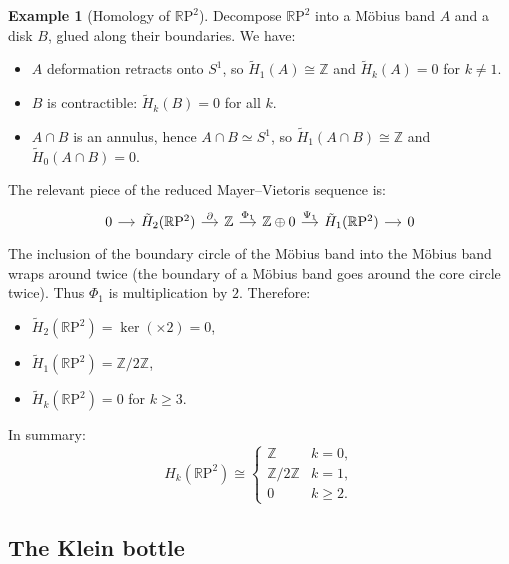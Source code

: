 \documentclass[12pt,a4paper,openany]{book}
\theoremstyle{definition}
\newtheorem{example}[definition]{Example}
\theoremstyle{plain}
\theoremstyle{remark}
\newcommand{\Z}{\mathbb{Z}}
\newcommand{\RP}{\mathbb{R}\mathrm{P}}
\begin{document}
\begin{example}[Homology of $\RP^2$]
Decompose $\RP^2$ into a M\"obius band $A$ and a disk $B$, glued
along their boundaries. We have:
\begin{itemize}
  \item $A$ deformation retracts onto $S^1$, so
    $\tilde{H}_1(A)\cong\Z$ and $\tilde{H}_k(A)=0$ for $k\neq 1$.
  \item $B$ is contractible: $\tilde{H}_k(B)=0$ for all $k$.
  \item $A\cap B$ is an annulus, hence $A\cap B\simeq S^1$, so
    $\tilde{H}_1(A\cap B)\cong\Z$ and $\tilde{H}_0(A\cap B)=0$.
\end{itemize}

The relevant piece of the reduced Mayer--Vietoris sequence is:
\[
\begin{tikzcd}[column sep=small]
0 \ar[r]
  & \tilde{H}_2(\RP^2) \ar[r,"\partial"]
  & \Z \ar[r,"\Phi_1"]
  & \Z\oplus 0 \ar[r,"\Psi_1"]
  & \tilde{H}_1(\RP^2) \ar[r]
  & 0
\end{tikzcd}
\]
The inclusion of the boundary circle of the M\"obius band into the
M\"obius band wraps around twice (the boundary of a M\"obius band
goes around the core circle twice). Thus $\Phi_1$ is multiplication
by $2$. Therefore:
\begin{itemize}
  \item $\tilde{H}_2(\RP^2)=\ker(\times 2)=0$,
  \item $\tilde{H}_1(\RP^2)=\Z/2\Z$,
  \item $\tilde{H}_k(\RP^2)=0$ for $k\geq 3$.
\end{itemize}

In summary:
\[
  H_k(\RP^2) \cong
  \begin{cases}
    \Z     & k=0,\\
    \Z/2\Z & k=1,\\
    0      & k\geq 2.
  \end{cases}
\]
\end{example}

\subsection{The Klein bottle}\label{subsec:mv-klein}
\end{document}
